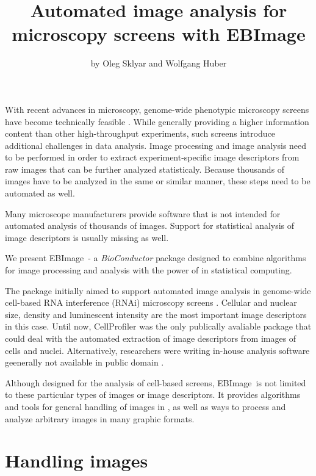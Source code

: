 
\newcommand{\lib}[1]{{\normalfont\textsf{#1}}}
\newcommand{\EBImage}{{\normalfont\textsf{EBImage}}}

\title{Automated image analysis for microscopy screens with EBImage}
\author{by Oleg Sklyar and Wolfgang Huber}

\maketitle

With recent advances in microscopy, genome-wide phenotypic microscopy screens have become technically feasible \citep{R:Neumann:2006}. While generally providing a higher information content than other high-throughput experiments, such screens introduce additional challenges in data analysis. Image processing and image analysis need to be performed in order to extract experiment-specific image descriptors from raw images that can be further analyzed statisticaly. Because thousands of images have to be analyzed in the same or similar manner, these steps need to be automated as well.

Many microscope manufacturers provide software that is not intended for automated analysis of thousands of images. Support for statistical analysis of image descriptors is usually missing as well.

We present \EBImage\ - a {\em BioConductor} package designed to combine algorithms for image processing and analysis with the power of \R{} in statistical computing.

The package initially aimed to support automated image analysis in genome-wide cell-based RNA interference (RNAi) microscopy screens \citep{R:Fuchs+Boutros:2006}. Cellular and nuclear size, density and luminescent intensity are the most important image descriptors in this case. Until now, \lib{CellProfiler} \citep{R:Carpenter:prep} was the only publically avaliable package that could deal with the automated extraction of image descriptors from images of cells and nuclei. Alternatively, researchers were writing in-house analysis software geenerally not available in public domain \citep{R:Neumann:2006}.

Although designed for the analysis of cell-based screens, \EBImage\ is not limited to these particular types of images or image descriptors. It provides algorithms and tools for general handling of images in \R{}, as well as ways to process and analyze arbitrary images in many graphic formats.

\section*{Handling images}

